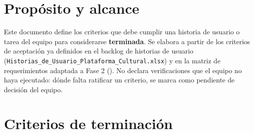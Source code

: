 \documentclass[11pt,a4paper]{article}
\begin{document}
\maketitlecapstone

\section{Propósito y alcance}

Este documento define los criterios que debe cumplir una historia de usuario o
tarea del equipo para considerarse \textbf{terminada}. Se elabora a partir de
los criterios de aceptación ya definidos en el backlog de historias de usuario
(\nolinkurl{Historias_de_Usuario_Plataforma_Cultural.xlsx}) y en la matriz de
requerimientos adaptada a Fase 2
(). No declara
verificaciones que el equipo no haya ejecutado: dónde falta ratificar un
criterio, se marca como pendiente de decisión del equipo.

\section{Criterios de terminación}
\end{document}
